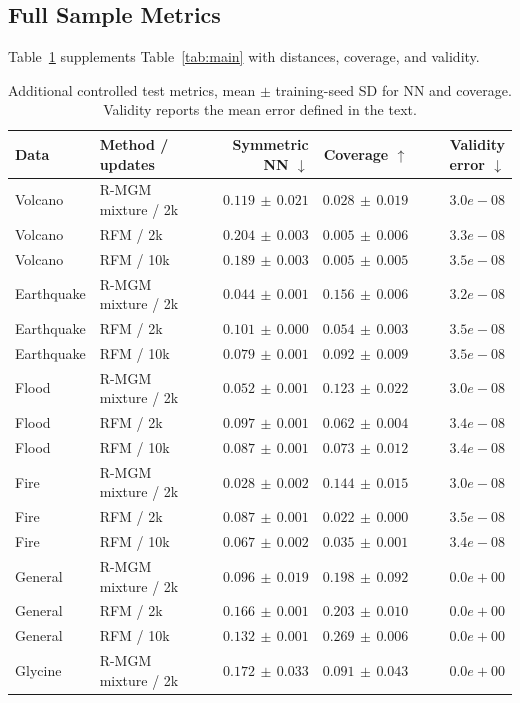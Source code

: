 \subsection{Full Sample Metrics}
Table~\ref{tab:all-metrics} supplements Table~\ref{tab:main} with distances, coverage, and validity.
\begin{table}[t]\caption{Additional controlled test metrics, mean $\pm$ training-seed SD for NN and coverage. Validity reports the mean error defined in the text.}\label{tab:all-metrics}\centering\small\begin{tabular}{@{}llrrr@{}}\toprule
Data & Method / updates & Symmetric NN $\downarrow$ & Coverage $\uparrow$ & Validity error $\downarrow$ \\
\midrule
Volcano & R-MGM mixture / 2k & $0.119\,\pm\,0.021$ & $0.028\,\pm\,0.019$ & $3.0e-08$ \\
Volcano & RFM / 2k & $0.204\,\pm\,0.003$ & $0.005\,\pm\,0.006$ & $3.3e-08$ \\
Volcano & RFM / 10k & $0.189\,\pm\,0.003$ & $0.005\,\pm\,0.005$ & $3.5e-08$ \\
Earthquake & R-MGM mixture / 2k & $0.044\,\pm\,0.001$ & $0.156\,\pm\,0.006$ & $3.2e-08$ \\
Earthquake & RFM / 2k & $0.101\,\pm\,0.000$ & $0.054\,\pm\,0.003$ & $3.5e-08$ \\
Earthquake & RFM / 10k & $0.079\,\pm\,0.001$ & $0.092\,\pm\,0.009$ & $3.5e-08$ \\
Flood & R-MGM mixture / 2k & $0.052\,\pm\,0.001$ & $0.123\,\pm\,0.022$ & $3.0e-08$ \\
Flood & RFM / 2k & $0.097\,\pm\,0.001$ & $0.062\,\pm\,0.004$ & $3.4e-08$ \\
Flood & RFM / 10k & $0.087\,\pm\,0.001$ & $0.073\,\pm\,0.012$ & $3.4e-08$ \\
Fire & R-MGM mixture / 2k & $0.028\,\pm\,0.002$ & $0.144\,\pm\,0.015$ & $3.0e-08$ \\
Fire & RFM / 2k & $0.087\,\pm\,0.001$ & $0.022\,\pm\,0.000$ & $3.5e-08$ \\
Fire & RFM / 10k & $0.067\,\pm\,0.002$ & $0.035\,\pm\,0.001$ & $3.4e-08$ \\
General & R-MGM mixture / 2k & $0.096\,\pm\,0.019$ & $0.198\,\pm\,0.092$ & $0.0e+00$ \\
General & RFM / 2k & $0.166\,\pm\,0.001$ & $0.203\,\pm\,0.010$ & $0.0e+00$ \\
General & RFM / 10k & $0.132\,\pm\,0.001$ & $0.269\,\pm\,0.006$ & $0.0e+00$ \\
Glycine & R-MGM mixture / 2k & $0.172\,\pm\,0.033$ & $0.091\,\pm\,0.043$ & $0.0e+00$ \\

\end{tabular}
\end{table}
